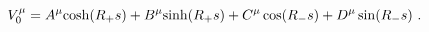 \begin{equation} \label{l81-23}
V_{0}^{\mu}=A^{\mu}{\rm cosh}(R_{+}s)+B^{\mu}{\rm sinh}(R_{+}s)+C^{\mu}\cos (R_{-}s)+D^{\mu}\sin (R_{-}s)~.
\end{equation}

